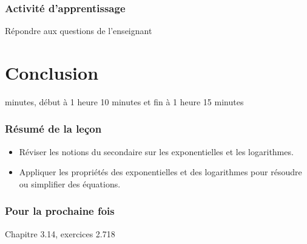 \documentclass[12pt]{article}
\begin{document}
\subsubsection*{\faCalculator{} Activité d'apprentissage}
Répondre aux questions de l'enseignant

\clearpage
\section{Conclusion}
 minutes, début à 1 heure 10 minutes et fin à 1 heure 15 minutes
\subsubsection*{\faList{} Résumé de la leçon}
\begin{itemize}
    \item Réviser les notions du secondaire sur les exponentielles et les logarithmes.
    \item Appliquer les propriétés des exponentielles et des logarithmes pour résoudre ou simplifier des équations.
\end{itemize}
\subsubsection*{\faCalendar*[regular]{} Pour la prochaine fois}
Chapitre 3.14, exercices 2.718
\end{document}
